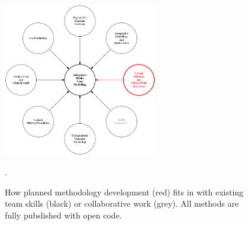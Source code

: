 \begin{figure}[htbp]
\centering
\includegraphics[width=0.6\textwidth]{./images/skills}
\caption{How planned methodology development (red) fits in with existing team skills (black) or collaborative work (grey). All methods are fully pubslished with open code.}.
\label{fig:expertise}
\end{figure}
